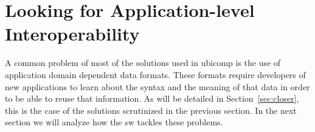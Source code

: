 \section{Looking for Application-level Interoperability}
\label{sec:interoperability}

A common problem of most of the solutions used in \ac{ubicomp} is the use of application domain dependent data formats.
These formats require developers of new applications to learn about the syntax and the meaning of that data in order to be able to reuse that information.
As will be detailed in Section~\ref{sec:closer}, this is the case of the solutions scrutinized in the previous section.
In the next section we will analyze how the \acl{sw} tackles these problems.




